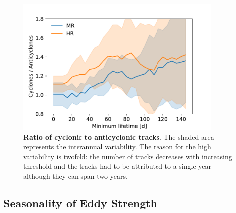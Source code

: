 \begin{figure}[h]
    \centering
    \includegraphics[width=10cm]{figures/result_eddies_lft_tracks.pdf}
    \caption[Ratio of cyclonic to anticyclonic tracks]{\textbf{Ratio of cyclonic to anticyclonic tracks}. The shaded area represents the interannual variability. The reason for the high variability is twofold: the number of tracks decreases with increasing threshold and the tracks had to be attributed to a single year although they can span two years.}
    \label{fig:meso_lft}
\end{figure}

\subsection{Seasonality of Eddy Strength}\label{sec:mesoscale-comparison}

